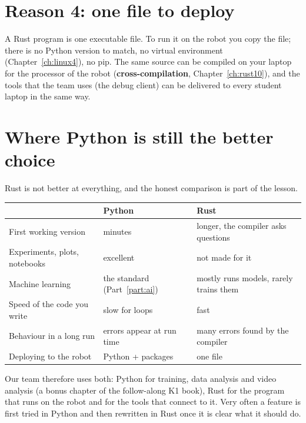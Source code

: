 \section*{Reason 4: one file to deploy}
A Rust program is one executable file. To run it on the robot you copy the file; there is no Python version to match, no virtual environment (Chapter~\ref{ch:linux4}), no pip. The same source can be compiled on your laptop for the processor of the robot (\textbf{cross-compilation}, Chapter~\ref{ch:rust10}), and the tools that the team uses (the debug client) can be delivered to every student laptop in the same way.

\section*{Where Python is still the better choice}
Rust is not better at everything, and the honest comparison is part of the lesson.
\begin{center}
\renewcommand{\arraystretch}{1.25}
\begin{tabular}{p{4.3cm}p{4.6cm}p{4.6cm}}
\textbf{} & \textbf{Python} & \textbf{Rust}\\ \hline
First working version & minutes & longer, the compiler asks questions\\
Experiments, plots, notebooks & excellent & not made for it\\
Machine learning & the standard (Part~\ref{part:ai}) & mostly runs models, rarely trains them\\
Speed of the code you write & slow for loops & fast\\
Behaviour in a long run & errors appear at run time & many errors found by the compiler\\
Deploying to the robot & Python + packages & one file\\
\end{tabular}
\end{center}
Our team therefore uses both: Python for training, data analysis and video analysis (a bonus chapter of the follow-along K1 book), Rust for the program that runs on the robot and for the tools that connect to it. Very often a feature is first tried in Python and then rewritten in Rust once it is clear what it should do.

